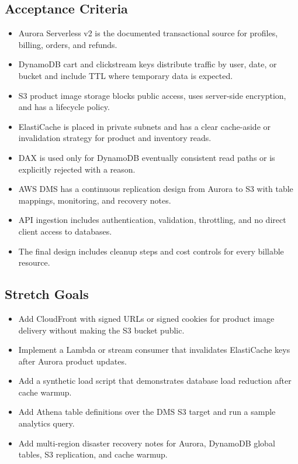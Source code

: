\subsection*{Acceptance Criteria}
\begin{itemize}
    \item Aurora Serverless v2 is the documented transactional source for profiles, billing, orders, and refunds.
    \item DynamoDB cart and clickstream keys distribute traffic by user, date, or bucket and include TTL where temporary data is expected.
    \item S3 product image storage blocks public access, uses server-side encryption, and has a lifecycle policy.
    \item ElastiCache is placed in private subnets and has a clear cache-aside or invalidation strategy for product and inventory reads.
    \item DAX is used only for DynamoDB eventually consistent read paths or is explicitly rejected with a reason.
    \item AWS DMS has a continuous replication design from Aurora to S3 with table mappings, monitoring, and recovery notes.
    \item API ingestion includes authentication, validation, throttling, and no direct client access to databases.
    \item The final design includes cleanup steps and cost controls for every billable resource.
\end{itemize}
\subsection*{Stretch Goals}
\begin{itemize}
    \item Add CloudFront with signed URLs or signed cookies for product image delivery without making the S3 bucket public.
    \item Implement a Lambda or stream consumer that invalidates ElastiCache keys after Aurora product updates.
    \item Add a synthetic load script that demonstrates database load reduction after cache warmup.
    \item Add Athena table definitions over the DMS S3 target and run a sample analytics query.
    \item Add multi-region disaster recovery notes for Aurora, DynamoDB global tables, S3 replication, and cache warmup.
\end{itemize}

